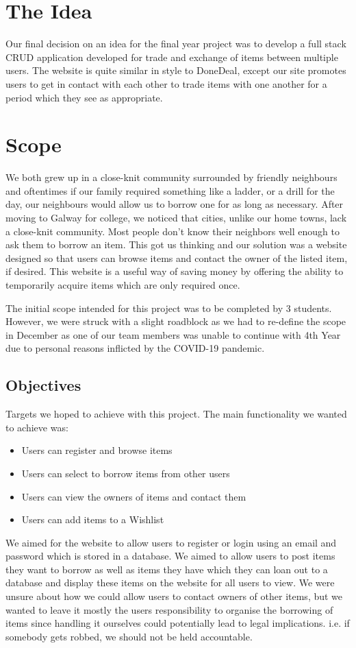 \section{The Idea}
Our final decision on an idea for the final year project was to develop a full stack CRUD application developed for trade and exchange of items between multiple users. The website is quite similar in style to DoneDeal, except our site promotes users to get in contact with each other to trade items with one another for a period which they see as appropriate.

\section{Scope}
We both grew up in a close-knit community surrounded by friendly neighbours and oftentimes if our family required something like a ladder, or a drill for the day, our neighbours would allow us to borrow one for as long as necessary. After moving to Galway for college, we noticed that cities, unlike our home towns, lack a close-knit community. Most people don't know their neighbors well enough to ask them to borrow an item. This got us thinking and our solution was a website designed so that users can browse items and contact the owner of the listed item, if desired. This website is a useful way of saving money by offering the ability to temporarily acquire items which are only required once. \par
The initial scope intended for this project was to be completed by 3 students. However, we were struck with a slight roadblock as we had to re-define the scope in December as one of our team members was unable to continue with 4th Year due to personal reasons inflicted by the COVID-19 pandemic.

\subsection{Objectives}
Targets we hoped to achieve with this project. The main functionality we wanted to achieve was:
\begin{itemize}
    \item Users can register and browse items

    \item Users can select to borrow items from other users

    \item Users can view the owners of items and contact them

    \item Users can add items to a Wishlist
\end{itemize}
We aimed for the website to allow users to register or login using an email and password which is stored in a database. We aimed to allow users to post items they want to borrow as well as items they have which they can loan out to a database and display these items on the website for all users to view. We were unsure about how we could allow users to contact owners of other items, but we wanted to leave it mostly the users responsibility to organise the borrowing of items since handling it ourselves could potentially lead to legal implications. i.e. if somebody gets robbed, we should not be held accountable.

